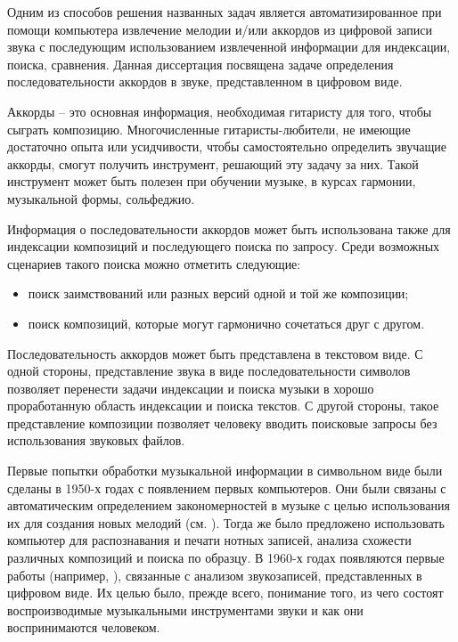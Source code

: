 Одним из способов решения названных задач является автоматизированное при помощи
компьютера извлечение мелодии и/или аккордов из цифровой записи звука с
последующим использованием извлеченной информации для индексации, поиска,
сравнения. Данная диссертация посвящена задаче определения последовательности
аккордов в звуке, представленном в цифровом виде.

Аккорды -- это основная информация, необходимая гитаристу для того, чтобы
сыграть композицию. Многочисленные гитаристы-любители, не имеющие достаточно
опыта или усидчивости, чтобы самостоятельно определить звучащие аккорды, смогут
получить инструмент, решающий эту задачу за них. Такой инструмент может быть
полезен при обучении музыке, в курсах гармонии, музыкальной формы, сольфеджио.

Информация о последовательности аккордов может быть использована также для
индексации композиций и последующего поиска по запросу. Среди возможных
сценариев такого поиска можно отметить следующие:
\begin{itemize}
  \item поиск заимствований или разных версий одной и той же композиции;
  \item поиск композиций, которые могут гармонично сочетаться друг с другом.
\end{itemize}

Последовательность аккордов может быть представлена в текстовом виде. С одной
стороны, представление звука в виде последовательности символов позволяет
перенести задачи индексации и поиска музыки в хорошо проработанную область
индексации и поиска текстов. С другой стороны, такое представление композиции
позволяет человеку вводить поисковые запросы без использования звуковых файлов.

\medskip

Первые попытки обработки музыкальной информации в символьном виде были сделаны в
1950-х годах с появлением первых компьютеров. Они были связаны с автоматическим
определением закономерностей в музыке с целью использования их для создания
новых мелодий (см. \cite{Schueler2005}). Тогда же было предложено использовать
компьютер для распознавания и печати нотных записей, анализа схожести различных
композиций и поиска по образцу. В 1960-х годах появляются первые работы
(например, \cite{Freedman1967}), связанные с анализом звукозаписей,
представленных в цифровом виде. Их целью было, прежде всего, понимание того, из
чего состоят воспроизводимые музыкальными инструментами звуки и как они
воспринимаются человеком.

